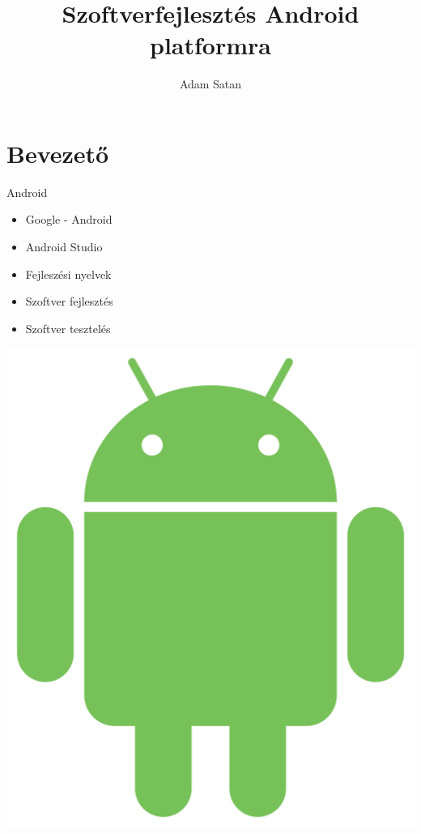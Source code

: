 \documentclass{beamer}
\title[Android Fejlesztés]{Szoftverfejlesztés Android platformra}
\author{Adam Satan}
\institute{Minőségbiztosítás informatikája}
\date{\the\year}
\begin{document}
\maketitle

\section{Bevezető}

\begin{frame}[fragile]{Android}
	\begin{minipage}{0.49\textwidth}		
		\begin{itemize}
			\item Google - Android
			\item Android Studio
			\item Fejleszési nyelvek
			\item Szoftver fejlesztés
			\item Szoftver tesztelés	
		\end{itemize}
	\end{minipage}
	\begin{minipage}{0.49\textwidth}
		\includegraphics[width=1 \linewidth]{figures/android.png}
	\end{minipage}
\end{frame}
\end{document}

